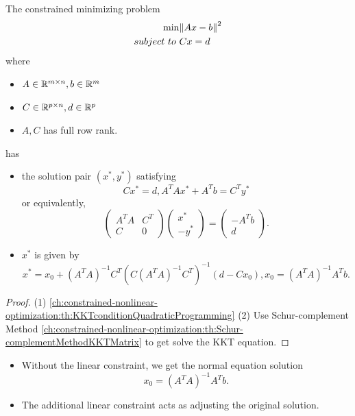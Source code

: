 \begin{refsection}
\begin{lemma}
	The constrained minimizing problem
	\begin{align*}
	\min & \norm{Ax - b}^2 \\
	subject~to~ & Cx = d
	\end{align*}	
	where
	\begin{itemize}
		\item $A\in \mathbb{R}^{m\times n}, b\in \mathbb{R}^m$
		\item $C \in \mathbb{R}^{p\times n}, d\in \mathbb{R}^p$
		\item $A,C$ has full row rank. 
	\end{itemize}
	has 
\begin{itemize}
	\item the solution pair $(x^*,y^*)$ satisfying
	$$Cx^* = d, A^TA x^* + A^Tb = C^Ty^*$$
	or equivalently,
	$$\begin{pmatrix}
	A^TA &C^T\\
	C &0
	\end{pmatrix}\begin{pmatrix}
	x^*\\
	-y^*
	\end{pmatrix} = \begin{pmatrix}
	-A^Tb\\
	d
	\end{pmatrix}.$$
	\item $x^*$ is given by
	$$x^* = x_0 + (A^TA)^{-1}C^T(C(A^TA)^{-1}C^T)^{-1}(d - Cx_0), x_0 = (A^TA)^{-1}A^Tb.$$
\end{itemize}	
\end{lemma}
\begin{proof}
(1) \autoref{ch:constrained-nonlinear-optimization:th:KKTconditionQuadraticProgramming}
(2) Use Schur-complement Method \autoref{ch:constrained-nonlinear-optimization:th:Schur-complementMethodKKTMatrix} to get solve the KKT equation.	
	
\end{proof}


\begin{remark}[interpretation]\hfill
\begin{itemize}
	\item Without the linear constraint, we get the normal equation solution $$x_0 = (A^TA)^{-1}A^Tb. $$	
	\item The additional linear constraint acts as adjusting the original solution.
\end{itemize}	

\end{remark}



\end{refsection}
